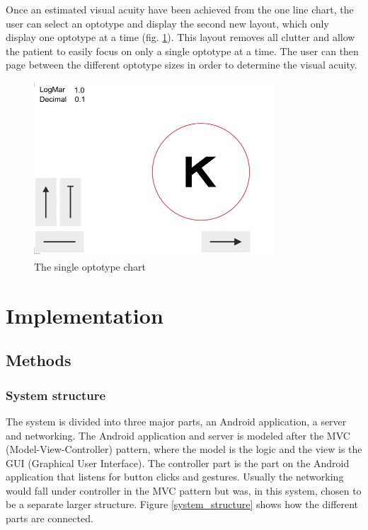 \documentclass[12pt,a4paper,notitlepage]{report}
\begin{document}
Once an estimated visual acuity have been achieved from the one line chart, the user can select an optotype and display the second new layout, which only display one optotype at a time (fig. \ref{fig:etdrs_single}). This layout removes all clutter and allow the patient to easily focus on only a single optotype at a time. The user can then page between the different optotype sizes in order to determine the visual acuity.

\begin{figure}[ht!  ]
\centering
\includegraphics[width=90mm]{images/etdrs_single.png}
\caption{The single optotype chart}
\label{fig:etdrs_single}
\end{figure}

\chapter{Implementation}
\section{Methods}
\subsection{System structure}
The system is divided into three major parts, an Android application, a server and networking. The Android application and server is modeled after the MVC (Model-View-Controller) pattern, where the model is the logic and the view is the GUI (Graphical User Interface). The controller part is the part on the Android application that listens for button clicks and gestures. Usually the networking would fall under controller in the MVC pattern but was, in this system, chosen to be a separate larger structure. Figure \ref{system_structure} shows how the different parts are connected.
\end{document}
